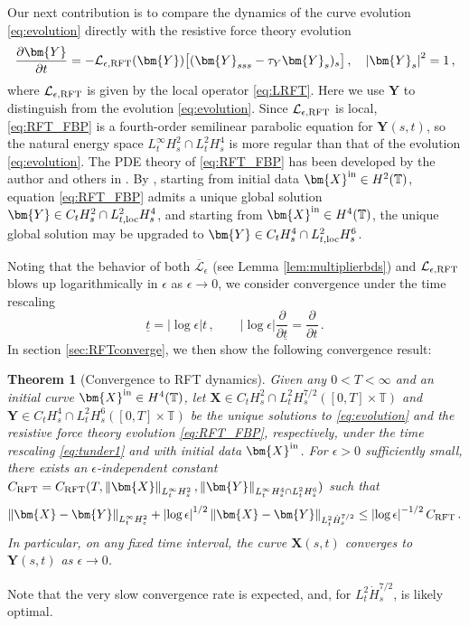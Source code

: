 \documentclass[11pt,reqno]{amsart}
\newcommand{\T}{\mathbb{T}}
\newcommand{\X}{\bm{X}}
\newcommand{\Y}{\bm{Y}}
\newcommand{\p}{\partial}
\newcommand{\abs}[1]{\left\lvert #1 \right\rvert}
\newcommand{\norm}[1]{\left\lVert #1 \right\rVert}
\newcommand{\mc}[1]{\mathcal{#1}}
\numberwithin{equation}{section}
\newtheorem{theorem}{Theorem}[section]
\theoremstyle{definition}
\begin{document}
Our next contribution is to compare the dynamics of the curve evolution \eqref{eq:evolution} directly with the resistive force theory evolution 
\begin{equation}\label{eq:RFT_FBP}
  \frac{\p\Y}{\p t} = -\mc{L}_{\epsilon,{\rm RFT}}(\Y)\big[(\Y_{sss}-\tau_Y\Y_s)_s\big] \,, \quad \abs{\Y_s}^2=1\,,
\end{equation}
where $\mc{L}_{\epsilon,{\rm RFT}}$ is given by the local operator \eqref{eq:LRFT}. Here we use $\Y$ to distinguish from the evolution \eqref{eq:evolution}. Since $\mc{L}_{\epsilon,{\rm RFT}}$ is local, \eqref{eq:RFT_FBP} is a fourth-order semilinear parabolic equation for $\Y(s,t)$, so the natural energy space $L^\infty_tH^2_s\cap L^2_tH^4_s$ is more regular than that of the evolution \eqref{eq:evolution}. The PDE theory of \eqref{eq:RFT_FBP} has been developed by the author and others in \cite{albritton2025rods,mori2023well,moreau2025n}. By \cite[Theorem 1.1]{albritton2025rods}, starting from initial data $\X^{\rm in}\in H^2(\T)$, equation \eqref{eq:RFT_FBP} admits a unique global solution $\Y\in C_tH^2_s\cap L^2_{t,{\rm loc}}H^4_s$, and starting from $\X^{\rm in}\in H^4(\T)$, the unique global solution may be upgraded to $\Y\in C_tH^4_s\cap L^2_{t,{\rm loc}}H^6_s$.  



Noting that the behavior of both $\overline{\mc{L}}_\epsilon$ (see Lemma \ref{lem:multiplierbds}) and $\mc{L}_{\epsilon,\rm RFT}$ blows up logarithmically in $\epsilon$ as $\epsilon\to 0$, we consider convergence under the time rescaling 
\begin{equation}\label{eq:tunder1}
  \underline{t} = \abs{\log\epsilon}t\,, \qquad \abs{\log\epsilon}\frac{\p}{\p\underline{t}} = \frac{\p}{\p t}\,.
\end{equation}
%
%
In section \ref{sec:RFTconverge}, we then show the following convergence result:
\begin{theorem}[Convergence to RFT dynamics]\label{thm:RFTconv}
  Given any $0<T<\infty$ and an initial curve $\X^{\rm in}\in H^4(\T)$, let $\X\in C_tH^2_s\cap L^2_tH^{7/2}_s([0,T]\times \T)$ and $\Y\in C_tH^4_s\cap L^2_tH^6_s([0,T]\times \T)$ be the unique solutions to \eqref{eq:evolution} and the resistive force theory evolution \eqref{eq:RFT_FBP}, respectively, under the time rescaling \eqref{eq:tunder1} and with initial data $\X^{\rm in}$. For $\epsilon>0$ sufficiently small, there exists an $\epsilon$-independent constant $C_{\rm RFT}=C_{\rm RFT}(T,\norm{\X}_{L^\infty_tH^2_s},\norm{\Y}_{L^\infty_tH^4_s\cap L^2_tH^6_s})$ such that
\begin{equation}
  \norm{\X-\Y}_{L^\infty_t H^2_s} + \abs{\log\epsilon}^{1/2}\norm{\X-\Y}_{L^2_t\dot H^{7/2}_s} 
  \le \abs{\log\epsilon}^{-1/2}C_{\rm RFT}\,.
\end{equation}
In particular, on any fixed time interval, the curve $\X(s,t)$ converges to $\Y(s,t)$ as $\epsilon\to 0$.
\end{theorem}
Note that the very slow convergence rate is expected, and, for $L^2_t\dot H^{7/2}_s$, is likely optimal. 
\end{document}
